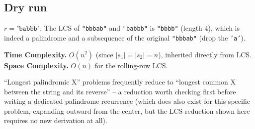 \subsection*{Dry run}


$r = \texttt{"babbb"}$. The LCS of \texttt{"bbbab"} and \texttt{"babbb"}
is \texttt{"bbbb"} (length $4$), which is indeed a palindrome and a
subsequence of the original \texttt{"bbbab"} (drop the \texttt{'a'}).

\begin{complexitybox}
\textbf{Time Complexity.} $O(n^2)$ (since $|s_1|=|s_2|=n$), inherited
directly from LCS.
\textbf{Space Complexity.} $O(n)$ for the rolling-row LCS.
\end{complexitybox}

\begin{takeawaybox}
``Longest palindromic X'' problems frequently reduce to ``longest common
X between the string and its reverse'' -- a reduction worth checking
first before writing a dedicated palindrome recurrence (which does also
exist for this specific problem, expanding outward from the center, but
the LCS reduction shown here requires no new derivation at all).
\end{takeawaybox}
